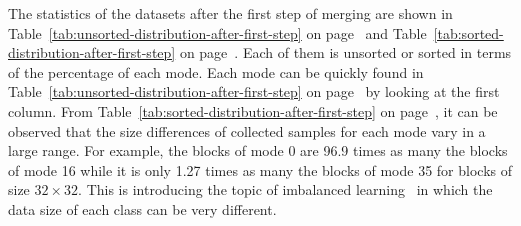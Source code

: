 The statistics of the datasets after the first step of merging are
shown in Table~\ref{tab:unsorted-distribution-after-first-step}
on page~\pageref{tab:unsorted-distribution-after-first-step} and 
Table~\ref{tab:sorted-distribution-after-first-step}
on page~\pageref{tab:sorted-distribution-after-first-step}.
Each of them is unsorted or sorted in terms of the percentage
of each mode.
Each mode can be quickly found 
in Table~\ref{tab:unsorted-distribution-after-first-step}
on page~\pageref{tab:unsorted-distribution-after-first-step}
by looking at the first column.
From Table~\ref{tab:sorted-distribution-after-first-step}
on page~\pageref{tab:sorted-distribution-after-first-step},
it can be observed that the size differences of collected samples 
for each mode vary in a large range.
For example, the blocks of mode 0 are 96.9 times as many
the blocks of mode 16
while it is only 1.27 times as many the blocks of mode 35
for blocks of size \(32\times32\).
This is introducing the topic of imbalanced 
learning~\parencite{RN215} in which
the data size of each class can be very different.

